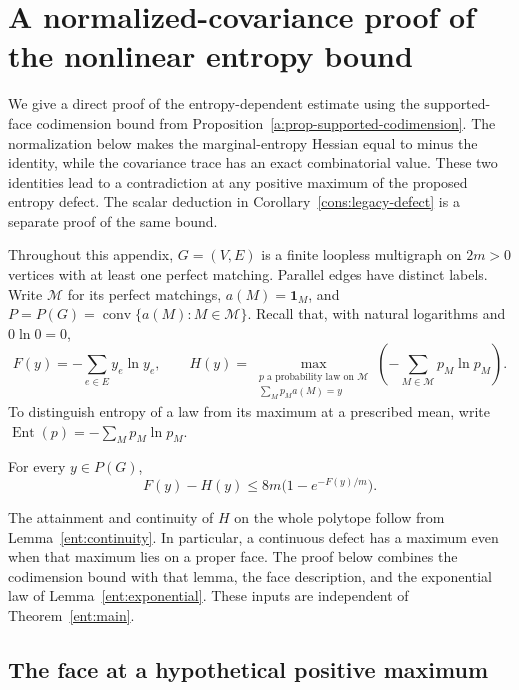 \section{A normalized-covariance proof of the nonlinear entropy bound}
\label{b:section}

We give a direct proof of the entropy-dependent estimate using the
supported-face codimension bound from
Proposition~\ref{a:prop-supported-codimension}.  The normalization below
makes the marginal-entropy Hessian equal to minus the identity, while
the covariance trace has an exact combinatorial value.  These two
identities lead to a contradiction at any positive maximum of the
proposed entropy defect.  The scalar deduction in
Corollary~\ref{cons:legacy-defect} is a separate proof of the same bound.

Throughout this appendix, \(G=(V,E)\) is a finite loopless multigraph
on \(2m>0\) vertices with at least one perfect matching.  Parallel
edges have distinct labels.  Write \(\mathcal M\) for its perfect
matchings, \(a(M)=\mathbf1_M\), and
\(P=P(G)=\operatorname{conv}\{a(M):M\in\mathcal M\}\).
Recall that, with natural logarithms and \(0\ln0=0\),
\[
 F(y)=-\sum_{e\in E}y_e\ln y_e,
 \qquad
 H(y)=\max_{\substack{p\text{ a probability law on }\mathcal M\\
                       \sum_Mp_Ma(M)=y}}
                   \left(-\sum_{M\in\mathcal M}p_M\ln p_M\right).
\]
To distinguish entropy of a law from its maximum at a prescribed mean,
write \(\operatorname{Ent}(p)=-\sum_Mp_M\ln p_M\).

\begin{theorem}
\label{b:thm-nonlinear}
For every \(y\in P(G)\),
\begin{equation}
 F(y)-H(y)\le 8m\bigl(1-e^{-F(y)/m}\bigr).
 \label{b:eq-nonlinear}
\end{equation}
\end{theorem}

The attainment and continuity of \(H\) on the whole polytope follow
from Lemma~\ref{ent:continuity}. In particular, a continuous defect
has a maximum even when that maximum lies on a proper face. The proof
below combines the codimension bound with that lemma, the face
description, and the exponential law of Lemma~\ref{ent:exponential}.
These inputs are independent of Theorem~\ref{ent:main}.

\subsection{The face at a hypothetical positive maximum}
\label{b:positive-maximum}


